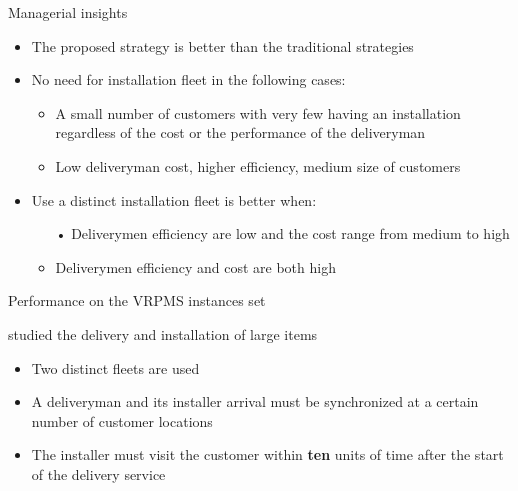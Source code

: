 \documentclass[9pt,xcolor={dvipsnames}]{beamer}
\begin{document}
\begin{frame}{Managerial insights}
\begin{block}{}
	\begin{itemize}
		\item The proposed strategy is better than the traditional strategies 
		\item  No need for installation fleet in the following cases: 
			\begin{itemize}
				\item A small number of customers with very few having an installation regardless of the cost or the performance of the deliveryman 
				\item Low deliveryman cost, higher efficiency, medium size of customers
			\end{itemize}
		\item Use a distinct installation fleet is better when:
			\begin{itemize}
				\item[•] Deliverymen efficiency are low and the cost range from medium to high
				\item Deliverymen efficiency and cost are both high
			\end{itemize}
	\end{itemize}
\end{block}{}
\end{frame}

\begin{frame}[allowframebreaks]{Performance on the VRPMS instances set}
	\begin{block}{ \cite{HOJABRI201887} studied the delivery and installation of large items}
		\begin{itemize}
			\item Two distinct fleets are used
			\item A deliveryman and its installer arrival must be synchronized at a certain number of customer locations
			\item The installer must visit the customer within \textbf{ten} units of time after the start of the delivery service
		\end{itemize}
	\end{block}

\end{frame}
\end{document}
